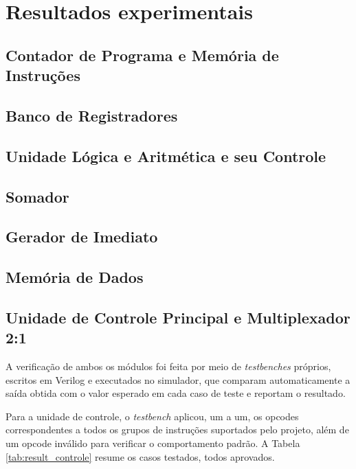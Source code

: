 \documentclass[conference]{IEEEtran}
\begin{document}
\section{Resultados experimentais}

\subsection{Contador de Programa e Memória de Instruções}

\subsection{Banco de Registradores}

\subsection{Unidade Lógica e Aritmética e seu Controle}

\subsection{Somador}

\subsection{Gerador de Imediato}

\subsection{Memória de Dados}

\subsection{Unidade de Controle Principal e Multiplexador 2:1}
A verificação de ambos os módulos foi feita por meio de \textit{testbenches} próprios, escritos em Verilog
e executados no simulador, que comparam automaticamente a saída obtida com o valor esperado em cada caso de
teste e reportam o resultado.

Para a unidade de controle, o \textit{testbench} aplicou, um a um, os opcodes correspondentes a todos os
grupos de instruções suportados pelo projeto, além de um opcode inválido para verificar o comportamento
padrão. A Tabela \ref{tab:result_controle} resume os casos testados, todos aprovados.
\end{document}
